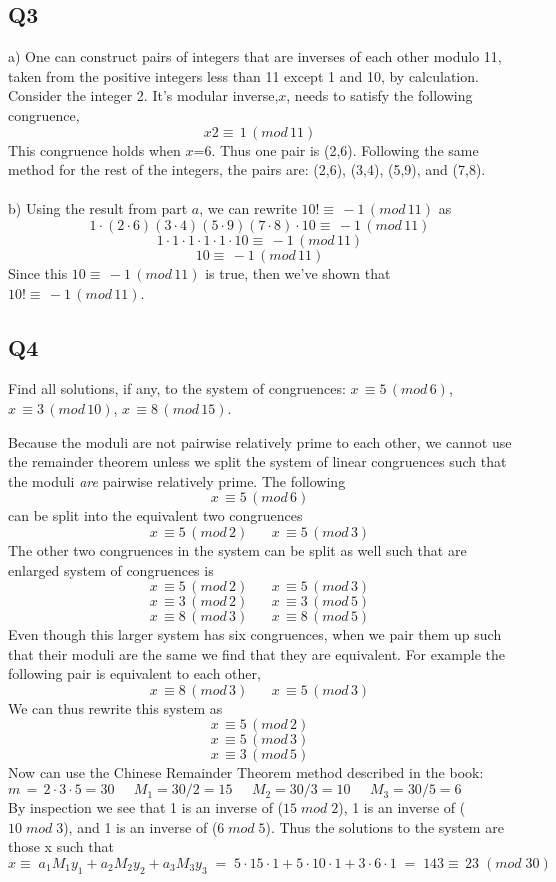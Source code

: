 \documentclass[12pt, oneside]{article}
\begin{document}
\subsection*{Q3}
a) One can construct pairs of integers that are inverses of each other modulo 11, taken from the positive integers less than 11 except 1 and 10, by calculation. Consider the integer 2. It's modular inverse,$x$, needs to satisfy the following congruence,
\[x2 \equiv\,1\,(mod\,11)\]
This congruence holds when $x$=6. Thus one pair is (2,6). Following the same method for the rest of the integers, the pairs are: (2,6), (3,4), (5,9), and (7,8).
\\\\
b) Using the result from part $a$, we can rewrite $10! \equiv\,-1\,(mod\,11)$ as
\[1\cdot(2\cdot6)(3\cdot4)(5\cdot9)(7\cdot8)\cdot10 \equiv\,-1\,(mod\,11)\]
\[1\cdot1\cdot1\cdot1\cdot1\cdot10 \equiv\,-1\,(mod\,11) \]
\[10 \equiv\,-1\,(mod\,11)\]
Since this $10 \equiv\,-1\,(mod\,11)$ is true, then we've shown that $10! \equiv\,-1\,(mod\,11)$.
\\
\subsection*{Q4}
Find all solutions, if any, to the system of congruences: $x\, \equiv 5\,(mod\,6)$, $x\, \equiv 3\,(mod\,10)$, $x\, \equiv 8\,(mod\,15)$.

Because the moduli are not pairwise relatively prime to each other, we cannot use the remainder theorem unless we split the system of linear congruences such that the moduli \textit{are} pairwise relatively prime. The following
\[x\, \equiv 5\,(mod\,6)\]
can be split into the equivalent two congruences
\[x\, \equiv 5\,(mod\,2)\;\;\;\;\;\;x\, \equiv 5\,(mod\,3)\]
The other two congruences in the system can be split as well such that are enlarged system of congruences is
\[x\, \equiv 5\,(mod\,2)\;\;\;\;\;\;x\, \equiv 5\,(mod\,3)\]
\[x\, \equiv 3\,(mod\,2)\;\;\;\;\;\;x\, \equiv 3\,(mod\,5)\]
\[x\, \equiv 8\,(mod\,3)\;\;\;\;\;\;x\, \equiv 8\,(mod\,5)\]
Even though this larger system has six congruences, when we pair them up such that their moduli are the same we find that they are equivalent. For example the following pair is equivalent to each other,
\[x\, \equiv 8\,(mod\,3)\;\;\;\;\;\;x\, \equiv 5\,(mod\,3)\]
We can thus rewrite this system as
\[x\, \equiv 5\,(mod\,2)\]
\[x\, \equiv 5\,(mod\,3)\]
\[x\, \equiv 3\,(mod\,5)\]
Now can use the Chinese Remainder Theorem method described in the book:\\
$m\,=\,2\cdot3\cdot5=30\;\;\;\;\;M_{1}=30/2=15\;\;\;\;\;M_{2}=30/3=10\;\;\;\;\;M_{3}=30/5=6$\\
By inspection we see that 1 is an inverse of ($15\;mod\;2$), 1 is an inverse of ($10\;mod\;3$), and 1 is an inverse of ($6\;mod\;5$). Thus the solutions to the system are those x such that
\[x\equiv\;a_{1}M_{1}y_{1} + a_{2}M_{2}y_{2} + a_{3}M_{3}y_{3}\;=\;5\cdot15\cdot1 + 5\cdot10\cdot1 + 3\cdot6\cdot1\;=\;143\equiv\,23\;(mod\;30)\]
\\\\\\
\end{document}
